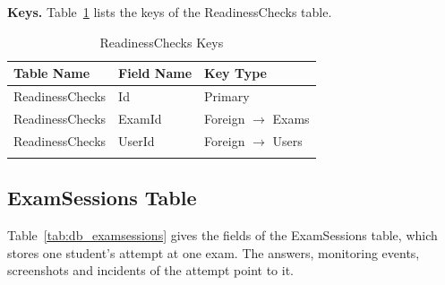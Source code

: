 \par\ifdim\dimexpr\pagegoal-\pagetotal\relax<180pt\newpage\fi
\noindent\textbf{Keys.} Table~\ref{tab:keys_readinesschecks} lists the keys of the ReadinessChecks table.

{\small
\begin{longtable}{>{\raggedright\arraybackslash}p{4.0cm}>{\raggedright\arraybackslash}p{4.6cm}>{\raggedright\arraybackslash}p{4.6cm}}
\caption{ReadinessChecks Keys}\label{tab:keys_readinesschecks}\\
\hline\hline
\textbf{Table Name} & \textbf{Field Name} & \textbf{Key Type} \\ \hline
\endfirsthead
\hline\hline
\endlastfoot
ReadinessChecks & Id & Primary \\*
ReadinessChecks & ExamId & Foreign $\rightarrow$ Exams \\*
ReadinessChecks & UserId & Foreign $\rightarrow$ Users \\*
\end{longtable}
}

\par\ifdim\dimexpr\pagegoal-\pagetotal\relax<376pt\newpage\fi
\subsection{ExamSessions Table}
Table~\ref{tab:db_examsessions} gives the fields of the ExamSessions table, which stores one student's attempt at one exam. The answers, monitoring events, screenshots and incidents of the attempt point to it.

